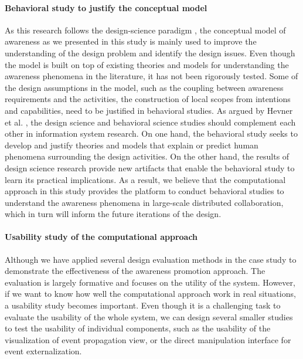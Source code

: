 \paragraph*{Behavioral study to justify the conceptual model} %
\label{par:behavioral_study_to_understand_the_conceptual_model}
As this research follows the design-science paradigm \cite{Hevner2004}, the conceptual model of awareness as we presented in this study is mainly used to improve the understanding of the design problem and identify the design issues. Even though the model is built on top of existing theories and models for understanding the awareness phenomena in the literature, it has not been rigorously tested. Some of the design assumptions in the model, such as the coupling between awareness requirements and the activities, the construction of local scopes from intentions and capabilities, need to be justified in behavioral studies. As argued by Hevner et al. \cite{Hevner2004}, the design science and behavioral science studies should complement each other in information system research. On one hand, the behavioral study seeks to develop and justify theories and models that explain or predict human phenomena surrounding the design activities. On the other hand, the results of design science research provide new artifacts that enable the behavioral study to learn its practical implications. As a result, we believe that the computational approach in this study provides the platform to conduct behavioral studies to understand the awareness phenomena in large-scale distributed collaboration, which in turn will inform the future iterations of the design. 

\paragraph*{Usability study of the computational approach} %
\label{par:usability_study_of_the_prototype_system}
Although we have applied several design evaluation methods in the case study to demonstrate the effectiveness of the awareness promotion approach. The evaluation is largely formative and focuses on the utility of the system. However, if we want to know how well the computational approach work in real situations, a usability study becomes important. Even though it is a challenging task to evaluate the usability of the whole system, we can design several smaller studies to test the usability of individual components, such as the usability of the visualization of event propagation view, or the direct manipulation interface for event externalization.


